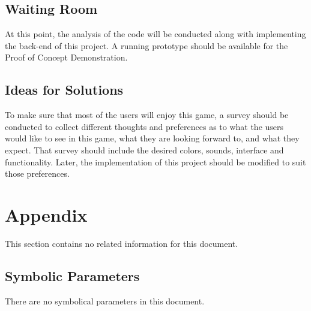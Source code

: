 \documentclass[12pt, titlepage]{article}
\begin{document}
\subsection{Waiting Room}
At this point, the analysis of the code will be conducted along with implementing the back-end of this project. A running prototype should be available for the Proof of Concept Demonstration.

\subsection{Ideas for Solutions}
To make sure that most of the users will enjoy this game, a survey should be conducted to collect different thoughts and preferences as to what the users would like to see in this game, what they are looking forward to, and what they expect. That survey should include the desired colors, sounds, interface and functionality. Later, the implementation of this project should be modified to suit those preferences.



\newpage
\section{Appendix}
This section contains no related information for this document.
\subsection{Symbolic Parameters}
There are no symbolical parameters in this document.
\end{document}
